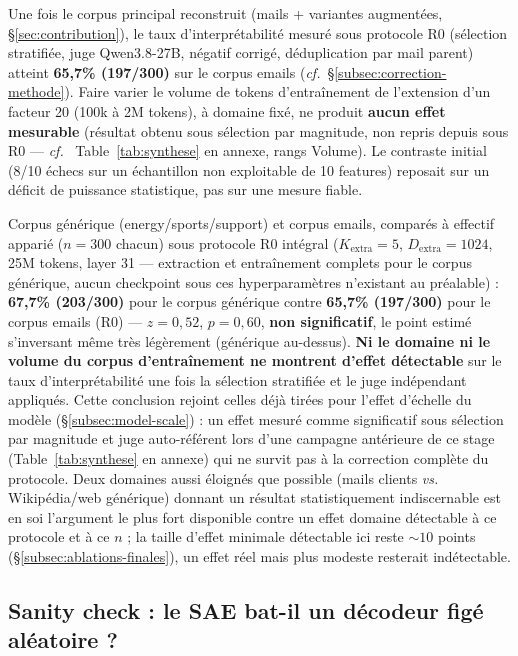 \documentclass[11pt]{article}
\begin{document}
Une fois le corpus principal reconstruit (mails + variantes augmentées,
\S\ref{sec:contribution}), le taux d'interprétabilité mesuré sous protocole
R0 (sélection stratifiée, juge Qwen3.8-27B, négatif corrigé, déduplication
par mail parent) atteint \textbf{65,7\% (197/300)} sur le corpus emails
(\emph{cf.}~\S\ref{subsec:correction-methode}). Faire varier le volume de
tokens d'entraînement de l'extension d'un facteur 20 (100k à 2M tokens), à
domaine fixé, ne produit \textbf{aucun effet mesurable} (résultat obtenu sous
sélection par magnitude, non repris depuis sous R0 --- \emph{cf.}~
Table~\ref{tab:synthese} en annexe, rangs \og{}Volume\fg{}). Le contraste
initial (8/10 échecs sur un échantillon non exploitable de 10 features)
reposait sur un déficit de puissance statistique, pas sur une mesure fiable.

\begin{resultbox}
Corpus générique (energy/sports/support) et corpus emails, comparés à
effectif apparié ($n=300$ chacun) sous protocole R0 intégral ($K_\text{extra}=5$,
$D_\text{extra}=1024$, 25M tokens, layer 31 --- extraction et entraînement
complets pour le corpus générique, aucun checkpoint sous ces hyperparamètres
n'existant au préalable) : \textbf{67,7\% (203/300)} pour le corpus générique
contre \textbf{65,7\% (197/300)} pour le corpus emails (R0) --- $z=0{,}52$,
$p=0{,}60$, \textbf{non significatif}, le point estimé s'inversant même très
légèrement (générique au-dessus). \textbf{Ni le domaine ni le volume du
corpus d'entraînement ne montrent d'effet détectable} sur le taux
d'interprétabilité une fois la sélection stratifiée et le juge indépendant
appliqués. Cette conclusion rejoint celles déjà tirées pour l'effet d'échelle
du modèle (\S\ref{subsec:model-scale}) : un effet mesuré comme significatif
sous sélection par magnitude et juge auto-référent lors d'une campagne
antérieure de ce stage (Table~\ref{tab:synthese} en annexe) qui ne survit pas
à la correction complète du protocole. Deux domaines aussi éloignés que
possible (mails clients \emph{vs.} Wikipédia/web générique) donnant un
résultat statistiquement indiscernable est en soi l'argument le plus fort
disponible contre un effet domaine détectable à ce protocole et à ce $n$ ; la
taille d'effet minimale détectable ici reste ${\sim}10$ points
(\S\ref{subsec:ablations-finales}), un effet réel mais plus modeste
resterait indétectable.
\end{resultbox}

\subsection{Sanity check : le SAE bat-il un décodeur figé aléatoire ?}
\label{subsec:sanity-check-resultats}
\end{document}
